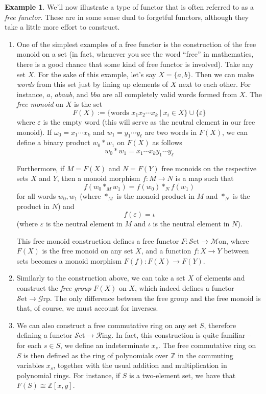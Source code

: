\documentclass[10pt,oneside]{book}
\def\~#1{\mathscr{#1}}
\newcommand{\Z}{\mathbb{Z}}
\newcommand{\Set}{\~S\mathrm{et}}
\newcommand{\Grp}{\~G\mathrm{rp}}
\newcommand{\Ring}{\~R\mathrm{ing}}
\newcommand{\Mon}{\~M\mathrm{on}}
\theoremstyle{plain}
\theoremstyle{definition}
\newtheorem{ex}[thm]{Example}
\theoremstyle{remark}
\numberwithin{equation}{section}
\numberwithin{figure}{section}
\begin{document}
\begin{ex}
\label{ex:free_functors}
    We'll now illustrate a type of functor that is often referred to as a \emph{free functor}. These are in some sense dual to forgetful functors, although they take a little more effort to construct. 
    \begin{enumerate}[label=(\roman*)]
        \item One of the simplest examples of a free functor is the construction of the free monoid on a set (in fact, whenever you see the word ``free'' in mathematics, there is a good chance that some kind of free functor is involved). Take any set $X$. For the sake of this example, let's say $X = \{a, b\}$. Then we can make \emph{words} from this set just by lining up elements of $X$ next to each other. For instance, $a$, $abaab$, and $bba$ are all completely valid words formed from $X$. The \emph{free monoid} on $X$ is the set
        \[F(X) := \{\text{words } x_1 x_2 \cdots x_k ~|~ x_i \in X\} \cup \{\varepsilon\}\]
        where $\varepsilon$ is the empty word (this will serve as the neutral element in our free monoid). If $\omega_0 = x_1 \cdots x_k$ and $w_1 = y_1 \cdots y_\ell$ are two words in $F(X)$, we can define a binary product $w_0 \ast w_1$ on $F(X)$ as follows
        \[w_0 \ast w_1 = x_1 \cdots x_k y_1 \cdots y_\ell\]
        
        Furthermore, if $M = F(X)$ and $N = F(Y)$ free monoids on the respective sets $X$ and $Y$, then a monoid morphism $f: M \to N$ is a map such that
        \[f(w_0 \ast_{M} w_1) = f(w_0) \ast_{N} f(w_1)\]
        for all words $w_0, w_1$ (where $\ast_{M}$ is the monoid product in $M$ and $\ast_N$ is the product in $N$) and
        \[f(\varepsilon) = \iota\]
        (where $\varepsilon$ is the neutral element in $M$ and $\iota$ is the neutral element in $N$).

        This free monoid construction defines a free functor $F: \Set \to \Mon$, where $F(X)$ is the free monoid on any set $X$, and a function $f: X \to Y$ between sets becomes a monoid morphism $F(f): F(X) \to F(Y)$. 

        \item Similarly to the construction above, we can take a set $X$ of elements and construct the \emph{free group} $F(X)$ on $X$, which indeed defines a functor $\Set \to \Grp$. The only difference between the free group and the free monoid is that, of course, we must account for inverses. 

        \item We can also construct a free commutative ring on any set $S$, therefore defining a functor $\Set \to \Ring$. In fact, this construction is quite familiar -- for each $s \in S$, we define an indeterminate $x_s$. The free commutative ring on $S$ is then defined as the ring of polynomials over $\Z$ in the commuting variables $x_s$, together with the usual addition and multiplication in polynomial rings. For instance, if $S$ is a two-element set, we have that $F(S) \cong \Z[x, y]$.


\end{enumerate}
\end{ex}
\end{document}
